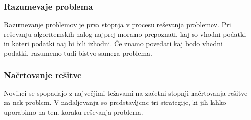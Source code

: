 \subsubsection{Razumevaje problema}
\label{sec:razumevanje problema}

Razumevanje problemov je prva stopnja v procesu reševanja
problemov. Pri reševanju algoritemskih nalog najprej moramo
prepoznati, kaj so vhodni podatki in kateri podatki naj bi bili
izhodni. Če znamo povedati kaj bodo vhodni podatki, razumemo tudi
bistvo samega problema.

\subsubsection{Načrtovanje rešitve}
\label{sec:načrtovanje_rešitve}

Novinci se spopadajo z največjimi težavami na začetni stopnji
načrtovanja rešitve za nek problem. V nadaljevanju so predstavljene
tri strategije, ki jih lahko uporabimo na tem koraku reševanja
problema.

